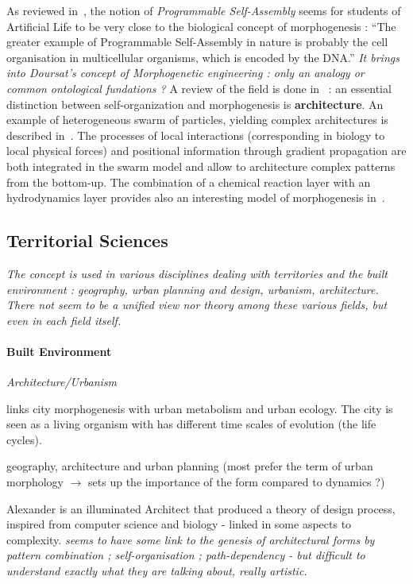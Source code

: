 \documentclass[fleqn,10pt]{wlscirep}
\begin{document}
As reviewed in~\cite{crosato2014self}, the notion of \emph{Programmable Self-Assembly} seems for students of Artificial Life to be very close to the biological concept of morphogenesis : ``The greater example of Programmable Self-Assembly in nature is probably the cell organisation in multicellular organisms, which is encoded by the DNA.'' \textit{It brings into Doursat's concept of Morphogenetic engineering : only an analogy or common ontological fundations ?} A review of the field is done in~\cite{doursat2013review} : an essential distinction between self-organization and morphogenesis is \textbf{architecture}. An example of heterogeneous swarm of particles, yielding complex architectures is described in~\cite{doursat2008programmable}. The processes of local interactions (corresponding in biology to local physical forces) and positional information through gradient propagation are both integrated in the swarm model and allow to architecture complex patterns from the bottom-up. The combination of a chemical reaction layer with an hydrodynamics layer provides also an interesting model of morphogenesis in~\cite{cussat2012synthesis}.




\subsection*{Territorial Sciences}

\textit{The concept is used in various disciplines dealing with territories and the built environment : geography, urban planning and design, urbanism, architecture. There not seem to be a unified view nor theory among these various fields, but even in each field itself.}

\paragraph{Built Environment}

\textit{Architecture/Urbanism}

\cite{olsen1982urban} links city morphogenesis with urban metabolism and urban ecology. The city is seen as a living organism with has different time scales of evolution (the life cycles).

\cite{moudon1997urban} geography, architecture and urban planning (most prefer the term of urban morphology $\rightarrow$ sets up the importance of the form compared to dynamics ?)

\cite{mehaffy2007notes} Alexander is an illuminated Architect that produced a theory of design process, inspired from computer science and biology - linked in some aspects to complexity. \textit{seems to have some link to the genesis of architectural forms by pattern combination ; self-organisation ; path-dependency - but difficult to understand exactly what they are talking about, really artistic.}
\end{document}
